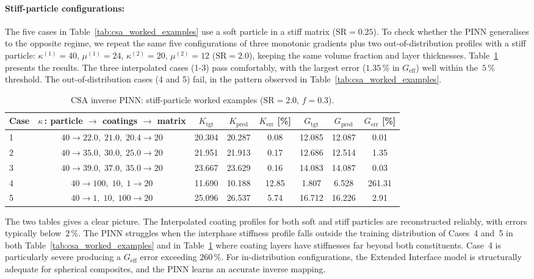 \documentclass[oneside, 12pt, a4paper, bibliography=totoc]{book}
\begin{document}
\paragraph{Stiff-particle configurations:}
The five cases in Table~\ref{tab:csa_worked_examples} use a soft particle in a stiff matrix ($\text{SR} = 0.25$). To check whether the PINN generalises to the opposite regime, we repeat the same five configurations of three monotonic gradients plus two out-of-distribution profiles with a stiff particle: $\kappa^{(1)} = 40$, $\mu^{(1)} = 24$, $\kappa^{(2)} = 20$, $\mu^{(2)} = 12$ ($\text{SR} = 2.0$), keeping the same volume fraction and layer thicknesses. Table~\ref{tab:csa_stiff_examples} presents the results. The three interpolated cases (1-3) pass comfortably, with the largest error ($1.35\,\%$ in $G_{\text{eff}}$) well within the~$5\,\%$ threshold. The out-of-distribution cases (4 and 5) fail, in the pattern observed in Table~\ref{tab:csa_worked_examples}.

\begin{table}[htbp]
\centering
\caption{CSA inverse PINN: stiff-particle worked examples ($\text{SR}=2.0$, $f=0.3$).}
\label{tab:csa_stiff_examples}
{\footnotesize
\begin{tabular}{l c c c c c c c}
\toprule
Case & $\kappa$\,: particle $\to$ coatings $\to$ matrix & $K_{\text{tgt}}$ & $K_{\text{pred}}$ & $K_{\text{err}}$ [\%] & $G_{\text{tgt}}$ & $G_{\text{pred}}$ & $G_{\text{err}}$ [\%] \\
\midrule
1 & $40 \to 22.0,\; 21.0,\; 20.4 \to 20$ & 20.304 & 20.287 & 0.08 & 12.085 & 12.087 & 0.01 \\
2 & $40 \to 35.0,\; 30.0,\; 25.0 \to 20$ & 21.951 & 21.913 & 0.17 & 12.686 & 12.514 & 1.35 \\
3 & $40 \to 39.0,\; 37.0,\; 35.0 \to 20$ & 23.667 & 23.629 & 0.16 & 14.083 & 14.087 & 0.03 \\
\midrule
4 & $40 \to 100,\; 10,\; 1 \to 20$       & 11.690 & 10.188 & 12.85 & 1.807 & 6.528 & 261.31 \\
5 & $40 \to 1,\; 10,\; 100 \to 20$       & 25.096 & 26.537 & 5.74 & 16.712 & 16.226 & 2.91 \\
\bottomrule
\end{tabular}
}
\end{table}

The two tables gives a clear picture. The Interpolated coating profiles for both soft and stiff particles are reconstructed reliably, with errors typically below~$2\,\%$. The PINN struggles when the interphase stiffness profile falls outside the training distribution of Cases~4 and~5 in both  Table~\ref{tab:csa_worked_examples} and in Table~\ref{tab:csa_stiff_examples} where coating layers have stiffnesses far beyond both constituents. Case~4 is particularly severe producing a $G_{\text{eff}}$ error exceeding $260\,\%$. For in-distribution configurations, the Extended Interface model is structurally adequate for spherical composites, and the PINN learns an accurate inverse mapping.
\end{document}
